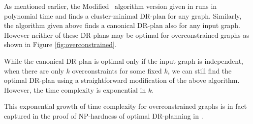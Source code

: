 As mentioned earlier, the Modified \frontier\ algorithm
version given in \cite{lomonosov2004graph} runs in polynomial time and finds a cluster-minimal DR-plan for any graph.
Similarly, the algorithm given above finds a canonical DR-plan also for any input graph.  However neither of these DR-plans may be optimal for overconstrained graphs as shown in Figure \ref{fig:overconstrained}.

While the canonical DR-plan is optimal only if the input graph is independent, when there are only $k$ overconstraints for some fixed $k$, we can still find the optimal DR-plan using a straightforward modification of the above algorithm. However, the time complexity is exponential in $k$.

This exponential growth of time complexity for overconstrained graphs is in fact captured in the proof of NP-hardness of optimal DR-planning in \cite{sitharam2005combinatorial, lomonosov2004graph}.
